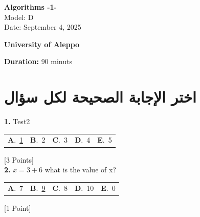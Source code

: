 \documentclass[12pt]{article}
\newcommand{\choice}[2]{\textbf{#1}.~#2}
\begin{document}
\begin{flushright}
{\Large \textbf{{\textenglish{Algorithms -1-}}}}\\[0.25em]
{\normalsize \textenglish{Model: }{\textenglish{D}}}\\[0.1em]
{\normalsize \textenglish{Date: }{\textenglish{September 4, 2025}}}
\end{flushright}

\vspace{0.6cm}

\noindent
\begin{minipage}[t]{0.65\textwidth}
  \raggedright
  \textbf{{\textenglish{University of Aleppo}}}\\[0.3em]
\end{minipage}\hfill
\begin{minipage}[t]{0.3\textwidth}
  \raggedleft
  \textenglish{\textbf{Duration: }}{\textenglish{90 minuts}}
\end{minipage}

\vspace{0.9cm}

\section*{اختر الإجابة الصحيحة لكل سؤال}

\noindent \textbf{\textenglish{1.}} {\textenglish{Test2}}

\begin{tabularx}{\linewidth}{@{}*{5}{Y}@{}}
\choice{A}{{\underline{{\textenglish{1}}}}} & \choice{B}{{{\textenglish{2}}}} & \choice{C}{{{\textenglish{3}}}} & \choice{D}{{{\textenglish{4}}}} & \choice{E}{{{\textenglish{5}}}} \\
\end{tabularx}
\hfill {\textenglish{[3 Points]}}\\[0.5em]

\noindent \textbf{\textenglish{2.}} \(x=3+6 \){\textenglish{ what is the value of x?}}

\begin{tabularx}{\linewidth}{@{}*{5}{Y}@{}}
\choice{A}{{{\textenglish{7}}}} & \choice{B}{{\underline{{\textenglish{9}}}}} & \choice{C}{{{\textenglish{8}}}} & \choice{D}{{{\textenglish{10}}}} & \choice{E}{{{\textenglish{0}}}} \\
\end{tabularx}
\hfill {\textenglish{[1 Point]}}\\[0.5em]
\end{document}

